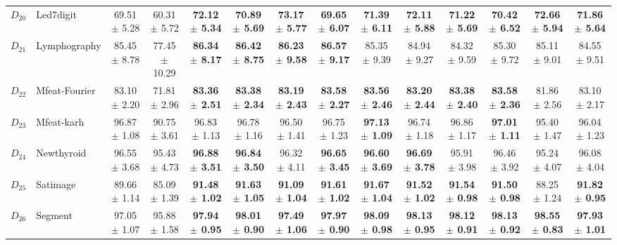 {\begin{landscape}
\begin{table}[!ht]
\begin{adjustbox}{width=1.5\textwidth,center=1.5\textwidth}
\begin{tabular}{rlcc|cccccccc|cc}
\rule{0pt}{17pt}$D_{20}$ & Led7digit & 69.51 $\pm$ 5.28  & 60.31  $\pm$ 5.72  & \textbf{72.12 $\pm$ 5.34} & \textbf{70.89 $\pm$ 5.69}  & \textbf{73.17 $\pm$ 5.77}   & \textbf{69.65  $\pm$ 6.07}  & \textbf{71.39 $\pm$ 6.11}  & \textbf{72.11 $\pm$ 5.88}  & \textbf{71.22 $\pm$ 5.69}  & \textbf{70.42 $\pm$ 6.52}   & \textbf{72.66 $\pm$ 5.94}  & \textbf{71.86  $\pm$ 5.64}  \\ 

\rule{0pt}{17pt}$D_{21}$ & Lymphography & 85.45 $\pm$ 8.78  & 77.45 $\pm$ 10.29   &\textbf{86.34  $\pm$ 8.17} &\textbf{86.42  $\pm$ 8.75}  &\textbf{86.23  $\pm$ 9.58}   &\textbf{86.57  $\pm$ 9.17}  &85.35  $\pm$ 9.39 &84.94  $\pm$ 9.27  &84.32  $\pm$ 9.59  & 85.30  $\pm$ 9.72  &85.11  $\pm$ 9.01  & 84.55 $\pm$ 9.51  \\

\rule{0pt}{17pt}$D_{22}$ & Mfeat-Fourier & 83.10 $\pm$ 2.20 & 71.81 $\pm$ 2.96 & \textbf{83.36  $\pm$ 2.51}  & \textbf{83.38 $\pm$ 2.34} & \textbf{83.19 $\pm$ 2.43} & \textbf{83.58 $\pm$ 2.27}  & \textbf{83.56 $\pm$ 2.46}  & \textbf{83.20  $\pm$ 2.44}  & \textbf{83.38 $\pm$ 2.40} & \textbf{83.58 $\pm$ 2.36} & 81.86 $\pm$ 2.56   & 83.10  $\pm$ 2.17  \\ 

\rule{0pt}{17pt}$D_{23}$ & 	Mfeat-karh & 96.87 $\pm$ 1.08  & 90.75  $\pm$ 3.61  &96.83  $\pm$ 1.13   &96.78  $\pm$ 1.16 & 96.50 $\pm$ 1.41  & 96.75 $\pm$ 1.23  & \textbf{97.13  $\pm$ 1.09}  &96.74  $\pm$ 1.18   & 96.86 $\pm$ 1.17 & \textbf{97.01 $\pm$ 1.11}  & 95.40 $\pm$ 1.47   & 96.04 $\pm$ 1.23 \\ 

 
\rule{0pt}{17pt}$D_{24}$ & 	Newthyroid & 96.55 $\pm$ 3.68 & 95.43  $\pm$ 4.73  & \textbf{96.88  $\pm$ 3.51}  &\textbf{96.84  $\pm$ 3.50}  & 96.32  $\pm$ 4.11  & \textbf{96.65 $\pm$ 3.45} & \textbf{96.60  $\pm$ 3.69} & \textbf{96.69 $\pm$ 3.78 } & 95.91 $\pm$ 3.98 & 96.46 $\pm$ 3.92  & 95.24  $\pm$ 4.07   & 96.08 $\pm$ 4.04 \\  
\rule{0pt}{17pt}$D_{25}$ & Satimage & 89.66 $\pm$ 1.14  & 85.09 $\pm$ 1.39 & \textbf{91.48 $\pm$ 1.02} & \textbf{ 91.63 $\pm$ 1.05} & \textbf{ 91.09 $\pm$ 1.04}  & \textbf{91.61 $\pm$ 1.02} & \textbf{ 91.67  $\pm$ 1.04} & \textbf{ 91.52 $\pm$ 1.02} & \textbf{ 91.54  $\pm$ 0.98} & \textbf{91.50  $\pm$ 0.98} & 88.25  $\pm$ 1.24 &\textbf{ 91.82 $\pm$ 0.95}  \\

\rule{0pt}{17pt}$D_{26}$ & Segment & 97.05 $\pm$ 1.07  & 95.88 $\pm$ 1.58   &\textbf{97.94  $\pm$ 0.95} & \textbf{98.01 $\pm$ 0.90}  & \textbf{97.49 $\pm$ 1.06}  & \textbf{97.97  $\pm$ 0.90}   & \textbf{98.09 $\pm$ 0.98}  &\textbf{ 98.13 $\pm$ 0.95}  &\textbf{98.12 $\pm$ 0.91}  &\textbf{98.13  $\pm$ 0.92 } &\textbf{98.55  $\pm$ 0.83}  & \textbf{97.93 $\pm$ 1.01} \\  


\end{tabular}
\end{adjustbox}
\end{table}
\end{landscape}}
